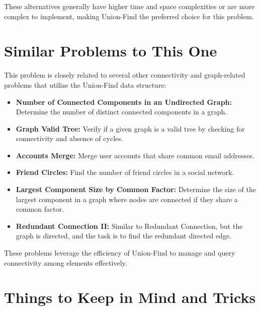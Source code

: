 These alternatives generally have higher time and space complexities or are more complex to implement, making Union-Find the preferred choice for this problem.

\section*{Similar Problems to This One}

This problem is closely related to several other connectivity and graph-related problems that utilize the Union-Find data structure:

\begin{itemize}
    \item \textbf{Number of Connected Components in an Undirected Graph:}  
    Determine the number of distinct connected components in a graph.
    
    \item \textbf{Graph Valid Tree:}  
    Verify if a given graph is a valid tree by checking for connectivity and absence of cycles.
    
    \item \textbf{Accounts Merge:}  
    Merge user accounts that share common email addresses.
    
    \item \textbf{Friend Circles:}  
    Find the number of friend circles in a social network.
    
    \item \textbf{Largest Component Size by Common Factor:}  
    Determine the size of the largest component in a graph where nodes are connected if they share a common factor.
    
    \item \textbf{Redundant Connection II:}  
    Similar to Redundant Connection, but the graph is directed, and the task is to find the redundant directed edge.
\end{itemize}

These problems leverage the efficiency of Union-Find to manage and query connectivity among elements effectively.

\section*{Things to Keep in Mind and Tricks}


